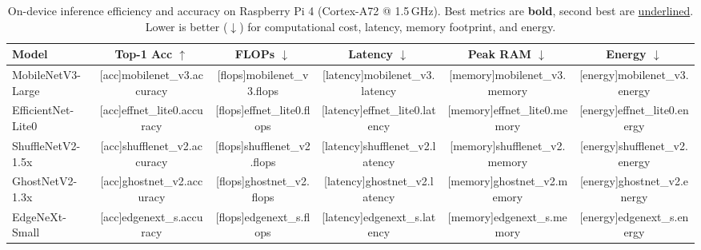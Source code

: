 \begin{table}[htbp]
\centering
\begin{threeparttable}
\caption{
On-device inference efficiency and accuracy on Raspberry Pi 4 (Cortex-A72 @ 1.5\,GHz).
Best metrics are \textbf{bold}, second best are \underline{underlined}.
Lower is better ($\downarrow$) for computational cost, latency, memory footprint, and energy.
}
\label{tab:edge_efficiency}
\begin{tabular}{lccccc}
\toprule
\textbf{Model} & \textbf{Top-1 Acc $\uparrow$} & \textbf{FLOPs $\downarrow$} & \textbf{Latency $\downarrow$} & \textbf{Peak RAM $\downarrow$} & \textbf{Energy $\downarrow$} \\
\midrule
MobileNetV3-Large  & [acc]{mobilenet_v3.accuracy} & [flops]{mobilenet_v3.flops} & [latency]{mobilenet_v3.latency} & [memory]{mobilenet_v3.memory} & [energy]{mobilenet_v3.energy} \\
EfficientNet-Lite0 & [acc]{effnet_lite0.accuracy} & [flops]{effnet_lite0.flops} & [latency]{effnet_lite0.latency} & [memory]{effnet_lite0.memory} & [energy]{effnet_lite0.energy} \\
ShuffleNetV2-1.5x  & [acc]{shufflenet_v2.accuracy} & [flops]{shufflenet_v2.flops} & [latency]{shufflenet_v2.latency} & [memory]{shufflenet_v2.memory} & [energy]{shufflenet_v2.energy} \\
GhostNetV2-1.3x    & [acc]{ghostnet_v2.accuracy}   & [flops]{ghostnet_v2.flops}   & [latency]{ghostnet_v2.latency}   & [memory]{ghostnet_v2.memory}   & [energy]{ghostnet_v2.energy} \\
EdgeNeXt-Small     & [acc]{edgenext_s.accuracy}    & [flops]{edgenext_s.flops}    & [latency]{edgenext_s.latency}    & [memory]{edgenext_s.memory}    & [energy]{edgenext_s.energy} \\
\bottomrule
\end{tabular}
\end{threeparttable}
\end{table}
